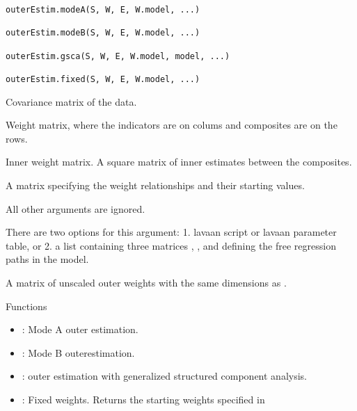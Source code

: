 \documentclass[a4paper]{book}
\begin{document}
%
\begin{Usage}
\begin{verbatim}
outerEstim.modeA(S, W, E, W.model, ...)

outerEstim.modeB(S, W, E, W.model, ...)

outerEstim.gsca(S, W, E, W.model, model, ...)

outerEstim.fixed(S, W, E, W.model, ...)
\end{verbatim}
\end{Usage}
%
\begin{Arguments}
\begin{ldescription}
\item[\code{S}] Covariance matrix of the data.

\item[\code{W}] Weight matrix, where the indicators are on colums and composites are on the rows.

\item[\code{E}] Inner weight matrix. A square matrix of inner estimates between the composites.

\item[\code{W.model}] A matrix specifying the weight relationships and their starting values.

\item[\code{...}] All other arguments are ignored.

\item[\code{model}] There are two options for this argument: 1. lavaan script or lavaan parameter
table, or 2. a list containing three matrices
, , and  defining the free regression paths
in the model.
\end{ldescription}
\end{Arguments}
%
\begin{Value}
A matrix of unscaled outer weights  with the same dimensions as .
\end{Value}
%
\begin{Section}{Functions}
\begin{itemize}

\item{} : Mode A outer estimation.

\item{} : Mode B outerestimation.

\item{} : outer estimation with generalized structured component analysis.

\item{} : Fixed weights. Returns the starting weights specified in 

\end{itemize}
\end{Section}
\end{document}
